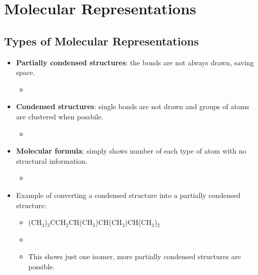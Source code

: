 \documentclass[12pt,a4paper]{article}
\begin{document}
\clearpage
\section{Molecular Representations}
\subsection{Types of Molecular Representations}
\begin{itemize}
    \item \textbf{Partially condensed structures}: the  bonds are not always drawn, saving space.
        \begin{itemize}
            \item \small{}
        \end{itemize}
    \item \textbf{Condensed structures}: single bonds are not drawn and groups of atoms are clustered when possbile.
        \begin{itemize}
            \item {}
        \end{itemize}
    \item \textbf{Molecular formula}: simply shows number of each type of atom with no structural information.
        \begin{itemize}
            \item {}
        \end{itemize}
    \item Example of converting a condensed structure into a partially condensed structure:
        \begin{itemize}
            \item ({\color{o-Sun}CH\(_{3}\)})\(_{3}\){\color{Liblue}CC}H\(_{2}\){\color{Liblue}C}H({\color{o-Sun}CH\(_{3}\)}){\color{Liblue}C}H({\color{o-Sun}CH\(_{3}\)}){\color{Liblue}C}H({\color{o-Sun}CH\(_{3}\)})\(_{2}\)
            \item {}
            \item This shows just one isomer, more partially condensed structures are possible.
        \end{itemize}


\end{itemize}
\end{document}
